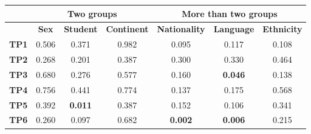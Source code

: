 \begin{table}
    \small
    \centering
    \begin{tabular}{lccc|ccc}
        \toprule
                      & \multicolumn{3}{c}{\textbf{Two groups}} & \multicolumn{3}{c}{\textbf{More than two groups}}                                                                                                                                                                       \\
        \midrule
                      & \multicolumn{1}{c}{\textbf{Sex}}        & \multicolumn{1}{c}{\textbf{Student}}              & \multicolumn{1}{c}{\textbf{Continent}} & \multicolumn{1}{c}{\textbf{Nationality}} & \multicolumn{1}{c}{\textbf{Language}}  & \multicolumn{1}{c}{\textbf{Ethnicity}} \\
        \midrule
        \textbf{TP1}  & 0.506                                   & 0.371                                             & 0.982                                  & 0.095                                    & 0.117                                  & 0.108                                  \\
        \textbf{TP2}  & 0.268                                   & 0.201                                             & 0.387                                  & 0.300                                    & 0.330                                  & 0.464                                  \\
        \textbf{TP3}  & 0.680                                   & 0.276                                             & 0.577                                  & 0.160                                    & \cellcolor[HTML]{EFEFEF}\textbf{0.046} & 0.138                                  \\
        \textbf{TP4}  & 0.756                                   & 0.441                                             & 0.774                                  & 0.137                                    & 0.175                                  & 0.568                                  \\
        \textbf{TP5}  & 0.392                                   & \cellcolor[HTML]{EFEFEF}\textbf{0.011}            & 0.387                                  & 0.152                                    & 0.106                                  & 0.341                                  \\
        \textbf{TP6}  & 0.260                                   & 0.097                                             & 0.682                                  & \cellcolor[HTML]{EFEFEF}\textbf{0.002}   & \cellcolor[HTML]{EFEFEF}\textbf{0.006} & 0.215                                  \\

\end{tabular}
\end{table}
